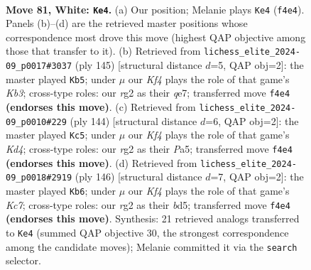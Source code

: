 \documentclass[11pt]{article}
\begin{document}
\clearpage

\begin{figure}[p]\centering
\begin{subfigure}{0.46\textwidth}\centering
\resizebox{\linewidth}{!}{%
\newchessgame
\chessboard[
  setfen={8/8/4k3/2p5/p2p1K2/8/6r1/8 w - - 2 81},
  showmover=false,
  pgfstyle=straightmove, color=movearrow, markmove={f4-e4}
]}
\caption{}
\end{subfigure}\hfill
\begin{subfigure}{0.46\textwidth}\centering
\resizebox{\linewidth}{!}{%
\newchessgame
\chessboard[
  setfen={8/4Q3/1k6/3K4/8/2P5/1P6/8 b - - 6 73},
  showmover=false,
  pgfstyle=straightmove, color=movearrow, markmove={b6-b5}
]}
\caption{}
\end{subfigure}
\\[4pt]
\begin{subfigure}{0.46\textwidth}\centering
\resizebox{\linewidth}{!}{%
\newchessgame
\chessboard[
  setfen={8/8/p3k3/Pp6/3K4/8/8/8 w - - 2 73},
  showmover=false,
  pgfstyle=straightmove, color=movearrow, markmove={d4-c5}
]}
\caption{}
\end{subfigure}\hfill
\begin{subfigure}{0.46\textwidth}\centering
\resizebox{\linewidth}{!}{%
\newchessgame
\chessboard[
  setfen={8/2K1k1p1/7p/3bn3/7P/8/8/8 w - - 0 74},
  showmover=false,
  pgfstyle=straightmove, color=movearrow, markmove={c7-b6}
]}
\caption{}
\end{subfigure}
\caption{\textbf{Move 81, White: \texttt{Ke4}.} (a) Our position; Melanie plays \texttt{Ke4} (\texttt{f4e4}). Panels (b)--(d) are the retrieved master positions whose correspondence most drove this move (highest QAP objective among those that transfer to it). (b) Retrieved from \texttt{lichess\_elite\_2024-09\_p0017\#3037} (ply 145) [structural distance $d$=5, QAP obj=2]: the master played \texttt{Kb5}; under $\mu$ our \emph{Kf4} plays the role of that game's \emph{Kb3}; cross-type roles: our \emph{r}g2 as their \emph{q}e7; transferred move \texttt{f4e4} \textbf{(endorses this move)}. (c) Retrieved from \texttt{lichess\_elite\_2024-09\_p0010\#229} (ply 144) [structural distance $d$=6, QAP obj=2]: the master played \texttt{Kc5}; under $\mu$ our \emph{Kf4} plays the role of that game's \emph{Kd4}; cross-type roles: our \emph{r}g2 as their \emph{P}a5; transferred move \texttt{f4e4} \textbf{(endorses this move)}. (d) Retrieved from \texttt{lichess\_elite\_2024-09\_p0018\#2919} (ply 146) [structural distance $d$=7, QAP obj=2]: the master played \texttt{Kb6}; under $\mu$ our \emph{Kf4} plays the role of that game's \emph{Kc7}; cross-type roles: our \emph{r}g2 as their \emph{b}d5; transferred move \texttt{f4e4} \textbf{(endorses this move)}. Synthesis: 21 retrieved analogs transferred to \texttt{Ke4} (summed QAP objective 30, the strongest correspondence among the candidate moves); Melanie committed it via the \texttt{search} selector.}
\label{fig:thought-m160}
\end{figure}
\end{document}
